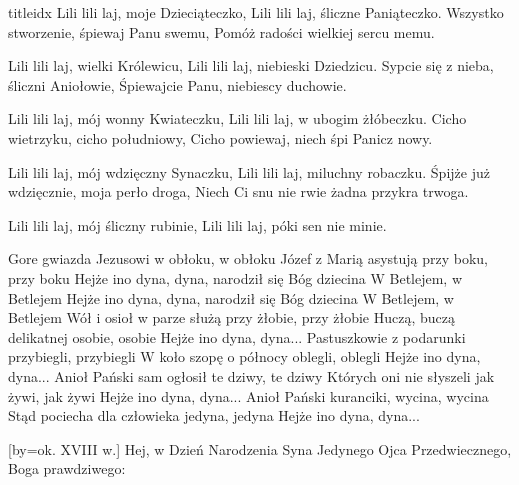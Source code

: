 \documentclass[a5paper, portrait, 12pt]{mwart}
\begin{document}
\begin{songs}{titleidx}
        Lili lili laj, moje Dzieciąteczko,
        Lili lili laj, śliczne Paniąteczko.
\endverse
\beginverse
    Wszystko stworzenie, śpiewaj Panu swemu,
    Pomóż radości wielkiej sercu memu.

        Lili lili laj, wielki Królewicu,
        Lili lili laj, niebieski Dziedzicu.
\endverse
\beginverse
    Sypcie się z nieba, śliczni Aniołowie,
    Śpiewajcie Panu, niebiescy duchowie.

        Lili lili laj, mój wonny Kwiateczku,
        Lili lili laj, w ubogim żłóbeczku.
\endverse
\beginverse
    Cicho wietrzyku, cicho południowy,
    Cicho powiewaj, niech śpi Panicz nowy.

        Lili lili laj, mój wdzięczny Synaczku,
        Lili lili laj, miluchny robaczku.
\endverse
\beginverse
    Śpijże już wdzięcznie, moja perło droga,
    Niech Ci snu nie rwie żadna przykra trwoga.

        Lili lili laj, mój śliczny rubinie,
        Lili lili laj, póki sen nie minie.
\endverse
\endsong


\beginverse
Gore gwiazda Jezusowi w obłoku, w obłoku
Józef z Marią asystują przy boku, przy boku
\endverse
\beginchorus
Hejże ino dyna, dyna, narodził się Bóg dziecina
W Betlejem, w Betlejem
Hejże ino dyna, dyna, narodził się Bóg dziecina
W Betlejem, w Betlejem
\endchorus
\beginverse
Wół i osioł w parze służą przy żłobie, przy żłobie
Huczą, buczą delikatnej osobie, osobie
\endverse
\beginchorus
Hejże ino dyna, dyna...
\endchorus
\beginverse
Pastuszkowie z podarunki przybiegli, przybiegli
W koło szopę o północy oblegli, oblegli
\endverse
\beginchorus
Hejże ino dyna, dyna...
\endchorus
\beginverse
Anioł Pański sam ogłosił te dziwy, te dziwy
Których oni nie słyszeli jak żywi, jak żywi
\endverse
\beginchorus
Hejże ino dyna, dyna...
\endchorus
\beginverse
Anioł Pański kuranciki, wycina, wycina
Stąd pociecha dla człowieka jedyna, jedyna
\endverse
\beginchorus
Hejże ino dyna, dyna...
\endchorus
\endsong


[by={ok. XVIII w.}]
\beginverse
    Hej, w Dzień Narodzenia Syna Jedynego
    Ojca Przedwiecznego, Boga prawdziwego:
\endverse		


\end{songs}
\end{document}

